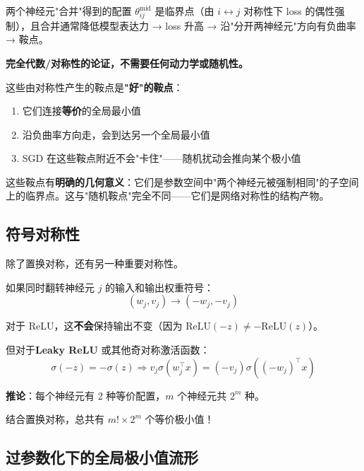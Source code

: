 \documentclass[12pt, a4paper]{ctexart}
\begin{document}
\begin{insight}[一行总结]
两个神经元"合并"得到的配置 $\theta^{\text{mid}}_{ij}$ 是临界点（由 $i \leftrightarrow j$ 对称性下 loss 的偶性强制），且合并通常降低模型表达力 → loss 升高 → 沿"分开两神经元"方向有负曲率 → 鞍点。

\textbf{完全代数/对称性的论证，不需要任何动力学或随机性。}
\end{insight}

\begin{insight}[对称性鞍点的特殊性]
这些由对称性产生的鞍点是\textbf{"好"的鞍点}：
\begin{enumerate}
    \item 它们连接\textbf{等价}的全局最小值
    \item 沿负曲率方向走，会到达另一个全局最小值
    \item SGD 在这些鞍点附近不会"卡住"——随机扰动会推向某个极小值
\end{enumerate}

这些鞍点有\textbf{明确的几何意义}：它们是参数空间中"两个神经元被强制相同"的子空间上的临界点。这与"随机鞍点"完全不同——它们是网络对称性的结构产物。
\end{insight}

\subsection{符号对称性}

除了置换对称，还有另一种重要对称性。

\begin{blackboard}

如果同时翻转神经元 $j$ 的输入和输出权重符号：
\[
(w_j, v_j) \to (-w_j, -v_j)
\]

对于 $\text{ReLU}$，这\textbf{不会}保持输出不变（因为 $\text{ReLU}(-z) \neq -\text{ReLU}(z)$）。

但对于\textbf{Leaky ReLU} 或其他奇对称激活函数：
\[
\sigma(-z) = -\sigma(z) \Rightarrow v_j \sigma(w_j^\top x) = (-v_j)\sigma((-w_j)^\top x)
\]

\textbf{推论}：每个神经元有 2 种等价配置，$m$ 个神经元共 $2^m$ 种。

结合置换对称，总共有 $m! \times 2^m$ 个等价极小值！

\end{blackboard}

\subsection{过参数化下的全局极小值流形}
\end{document}
